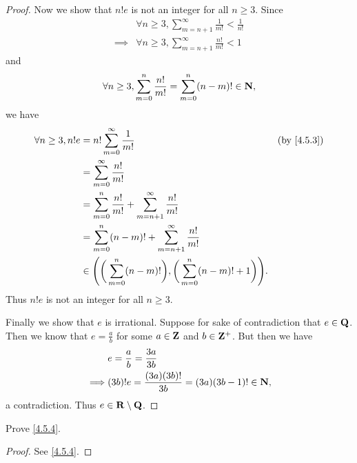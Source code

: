\begin{proof}
  Now we show that \(n! e\) is not an integer for all \(n \geq 3\).
  Since
  \begin{align*}
             & \forall n \geq 3, \sum_{m = n + 1}^\infty \frac{1}{m!} < \frac{1}{n!} \\
    \implies & \forall n \geq 3, \sum_{m = n + 1}^\infty \frac{n!}{m!} < 1
  \end{align*}
  and
  \[
    \forall n \geq 3, \sum_{m = 0}^n \frac{n!}{m!} = \sum_{m = 0}^n (n - m)! \in \mathbf{N},
  \]
  we have
  \begin{align*}
    \forall n \geq 3, n! e & = n! \sum_{m = 0}^\infty \frac{1}{m!}                                                         & \text{(by \cref{4.5.3})} \\
                           & = \sum_{m = 0}^\infty \frac{n!}{m!}                                                                                      \\
                           & = \sum_{m = 0}^n \frac{n!}{m!} + \sum_{m = n + 1}^\infty \frac{n!}{m!}                                                   \\
                           & = \sum_{m = 0}^n (n - m)! + \sum_{m = n + 1}^\infty \frac{n!}{m!}                                                        \\
                           & \in \Bigg(\bigg(\sum_{m = 0}^n (n - m)!\bigg), \bigg(\sum_{m = 0}^n (n - m)! + 1\bigg)\Bigg).
  \end{align*}
  Thus \(n! e\) is not an integer for all \(n \geq 3\).

  Finally we show that \(e\) is irrational.
  Suppose for sake of contradiction that \(e \in \mathbf{Q}\).
  Then we know that \(e = \frac{a}{b}\) for some \(a \in \mathbf{Z}\) and \(b \in \mathbf{Z}^+\).
  But then we have
  \begin{align*}
             & e = \frac{a}{b} = \frac{3a}{3b}                          \\
    \implies & (3b)! e = \frac{(3a) (3b)!}{3b} = (3a) (3b - 1)! \in \mathbf{N},
  \end{align*}
  a contradiction.
  Thus \(e \in \mathbf{R} \setminus \mathbf{Q}\).
\end{proof}

\begin{exercise}\label{ex 4.5.3}
  Prove \cref{4.5.4}.
\end{exercise}

\begin{proof}
  See \cref{4.5.4}.
\end{proof}

